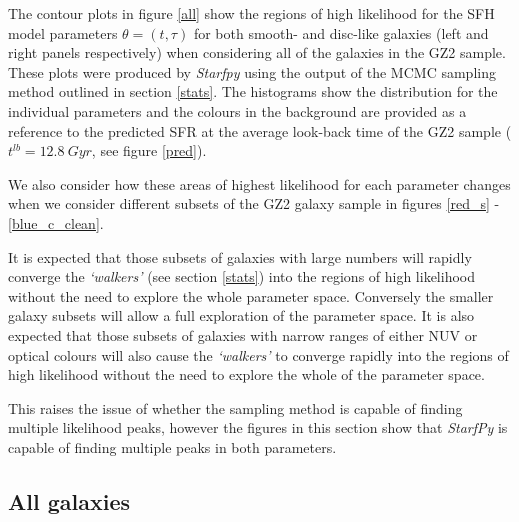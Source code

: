 \documentclass{mn2e}
\begin{document}
The contour plots in figure \ref{all} show the regions of high likelihood for the SFH model parameters $\theta = (t, \tau)$ for both smooth- and disc-like galaxies (left and right panels respectively) when considering all of the galaxies in the GZ2 sample. These plots were produced by \emph{Starfpy} using the output of the MCMC sampling method outlined in section \ref{stats}. The histograms show the distribution for the individual parameters and the colours in the background are provided as a reference to the predicted SFR at the average look-back time of the GZ2 sample ($t^{lb}=12.8~Gyr$, see figure \ref{pred}). 

We also consider how these areas of highest likelihood for each parameter changes when we consider different subsets of the GZ2 galaxy sample in figures \ref{red_s} - \ref{blue_c_clean}.

It is expected that those subsets of galaxies with large numbers will rapidly converge the \emph{`walkers'} (see section \ref{stats}) into the regions of high likelihood without the need to explore the whole parameter space. Conversely the smaller galaxy subsets will allow a full exploration of the parameter space. It is also expected that those subsets of galaxies with narrow ranges of either NUV or optical colours will also cause the \emph{`walkers'} to converge rapidly into the regions of high likelihood without the need to explore the whole of the parameter space.


This raises the issue of whether the sampling method is capable of finding multiple likelihood peaks, however the figures in this section show that \emph{StarfPy} is capable of finding multiple peaks in both parameters. 

\subsection{All galaxies}
\end{document}

